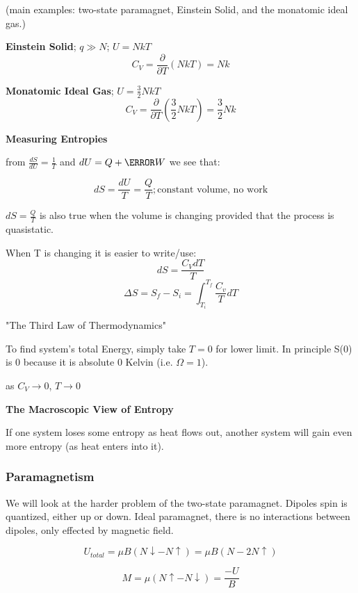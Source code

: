 (main examples: two-state paramagnet, Einstein Solid, and the monatomic ideal gas.)

\textbf{Einstein Solid}; $q \gg N$; $U=NkT$
\[C_V = \frac{\partial}{\partial T}(NkT) = Nk\]

\textbf{Monatomic Ideal Gas}; $U=\frac{3}{2}NkT$
\[C_V = \frac{\partial}{\partial T}(\frac{3}{2}NkT) = \frac{3}{2}Nk\]

\textbf{Measuring Entropies}

from $\frac{dS}{dU}=\frac{1}{T}$ and $dU = Q + \cancel{W} $ we see that:

\begin{equation}
    dS = \frac{dU}{T} = \frac{Q}{T} ; \text{constant volume, no work}
\end{equation}

$dS = \frac{Q}{T}$ is also true when the volume is changing provided that the process is quasistatic.

When T is changing it is easier to write/use:
\[dS = \frac{C_V dT}{T}\]
\begin{equation}
 \Delta S = S_f - S_i = \int_{T_i}^{T_f} \frac{C_v}{T}dT
\end{equation}

"The Third Law of Thermodynamics"

To find system's total Energy, simply take $T=0$ for lower limit. In principle S(0) is 0 because it is absolute 0 Kelvin (i.e. $\Omega = 1$).

as $C_V \rightarrow 0$, $T \rightarrow 0$

\textbf{The Macroscopic View of Entropy}

If one system loses some entropy as heat flows out, another system will gain even more entropy (as heat enters into it).

\subsubsection{Paramagnetism}

We will look at the harder problem of the two-state paramagnet. Dipoles spin is quantized, either up or down. Ideal paramagnet, there is no interactions between dipoles, only effected by magnetic field.

\begin{equation}
    U_{total} = \mu B(N\downarrow - N\uparrow) = \mu B(N-2N\uparrow)
\end{equation}

\begin{equation}
    M = \mu (N\uparrow - N\downarrow) = \frac{-U}{B}
\end{equation}

